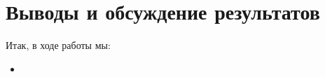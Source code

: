 \section{Выводы и обсуждение результатов}

Итак, в ходе работы мы:
\begin{itemize}
    \item
\end{itemize}
